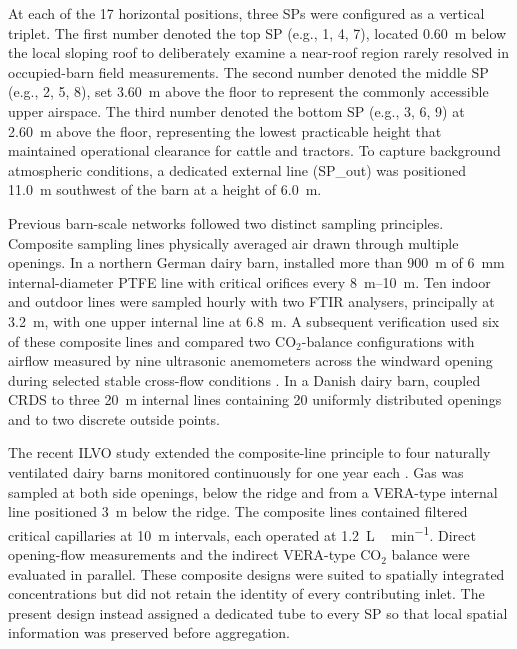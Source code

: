 \documentclass[12pt,a4paper]{article}
\begin{document}
At each of the 17 horizontal positions, three SPs were configured as a vertical triplet. The first number denoted the top SP (e.g., 1, 4, 7), located \SI{0.60}{m} below the local sloping roof to deliberately examine a near-roof region rarely resolved in occupied-barn field measurements. The second number denoted the middle SP (e.g., 2, 5, 8), set \SI{3.60}{m} above the floor to represent the commonly accessible upper airspace. The third number denoted the bottom SP (e.g., 3, 6, 9) at \SI{2.60}{m} above the floor, representing the lowest practicable height that maintained operational clearance for cattle and tractors. To capture background atmospheric conditions, a dedicated external line (SP\_out) was positioned \SI{11.0}{m} southwest of the barn at a height of \SI{6.0}{m}.

Previous barn-scale networks followed two distinct sampling principles. Composite sampling lines physically averaged air drawn through multiple openings. In a northern German dairy barn, \citet{JankeSampling2020} installed more than \SI{900}{m} of \SI{6}{mm} internal-diameter PTFE line with critical orifices every \SIrange{8}{10}{m}. Ten indoor and outdoor lines were sampled hourly with two FTIR analysers, principally at \SI{3.2}{m}, with one upper internal line at \SI{6.8}{m}. A subsequent verification used six of these composite lines and compared two \(\mathrm{CO_2}\)-balance configurations with airflow measured by nine ultrasonic anemometers across the windward opening during selected stable cross-flow conditions \citep{Janke2022}. In a Danish dairy barn, \citet{Kamp2019} coupled CRDS to three \SI{20}{m} internal lines containing 20 uniformly distributed openings and to two discrete outside points.

The recent ILVO study extended the composite-line principle to four naturally ventilated dairy barns monitored continuously for one year each \citep{Declerck2025}. Gas was sampled at both side openings, below the ridge and from a VERA-type internal line positioned \SI{3}{m} below the ridge. The composite lines contained filtered critical capillaries at \SI{10}{m} intervals, each operated at \SI{1.2}{L\,min^{-1}}. Direct opening-flow measurements and the indirect VERA-type \(\mathrm{CO_2}\) balance were evaluated in parallel. These composite designs were suited to spatially integrated concentrations but did not retain the identity of every contributing inlet. The present design instead assigned a dedicated tube to every SP so that local spatial information was preserved before aggregation.
\end{document}
